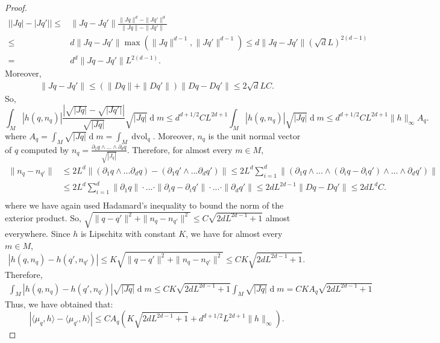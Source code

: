 \documentclass[10pt,a4paper]{amsart}
\begin{document}
\begin{proof}
\begin{align*}
    \left||Jq|-|Jq'|\right|\leq& \|Jq-Jq'\| \frac{\|Jq\|^d-\|Jq'\|^d}{\|Jq\|-\|Jq'\|} \\
    \leq& d \|Jq-Jq'\| \max\left(\|Jq\|^{d-1},\|Jq'\|^{d-1}\right)\leq d \|Jq-Jq'\| (\sqrt{d}L)^{2(d-1)}\\
    =&d^d \|Jq-Jq'\| L^{2(d-1)}.
\end{align*} 
Moreover,
\begin{align*}
    \|Jq-Jq'\|\leq (\|Dq\|+\|Dq'\|)\|Dq-Dq'\|\leq 2\sqrt{d}LC.
\end{align*}
So,
\begin{equation*}
    \int_{M} |h(q,n_q)|\frac{\left|\sqrt{|Jq|}-\sqrt{|Jq'|}\right|}{\sqrt{|Jq|}} \sqrt{|Jq|}\operatorname{d}m\leq d^{d+1/2}CL^{2d+1}\int_M |h(q,n_q)|\sqrt{|Jq|}\operatorname{d}m \leq d^{d+1/2}CL^{2d+1}\|h\|_{\infty}A_q.
\end{equation*} 
where $A_q=\int_M \sqrt{|Jq|}\operatorname{d}m = \int_M \operatorname{d vol}_q$. Moreover, $n_q$ is the unit normal vector of $q$ computed by $n_q = \frac{\partial_1q\wedge\ldots\wedge\partial_dq}{\sqrt{|J_q|}}$. Therefore, for almost every $m\in M$, 
\begin{align*}
    \|n_q-n_{q'}\|&\leq 2L^d\|(\partial_1q\wedge...\partial_dq)-(\partial_1q'\wedge...\partial_dq')\|\leq2L^d\sum_{i=1}^d\|(\partial_1q\wedge...\wedge(\partial_iq-\partial_iq')\wedge...\wedge\partial_dq')\|\\
    &\leq2L^d\sum_{i=1}^d \|\partial_1q\|\cdot...\cdot\|\partial_iq-\partial_iq'\|\cdot...\cdot\|\partial_dq'\|\leq 2dL^{2d-1} \|Dq-Dq'\|\leq 2dL^dC.\\
\end{align*}
where we have again used Hadamard's inequality to bound the norm of the exterior product. So, $\sqrt{\|q-q'\|^2+\|n_q-n_{q'}\|^2}\leq  C\sqrt{2dL^{2d-1} + 1}$ almost everywhere.
Since $h$ is Lipschitz with constant $K$, we have for almost every $m \in M$,
\begin{equation*}
    |h(q, n_q) - h(q', n_{q'})| \leq K \sqrt{\|q-q'\|^2+\|n_q-n_{q'}\|^2} \leq CK\sqrt{2dL^{2d-1} + 1} .
\end{equation*} 
Therefore,
\begin{align*}
    \int_{M} \left|h(q,n_q)-h(q',n_{q'})\right| \sqrt{|Jq|} \operatorname{d}m \leq CK\sqrt{2dL^{2d-1} + 1}\int_M\sqrt{|Jq|}\operatorname{d}m = CKA_q\sqrt{2dL^{2d-1} + 1}
\end{align*}
Thus, we have obtained that:
\begin{equation*}
    |\langle\mu_q,h\rangle-\langle\mu_{q'},h\rangle|\leq CA_q(K\sqrt{2dL^{2d-1} + 1}+d^{d+1/2}L^{2d+1}\|h\|_{\infty}).
\end{equation*}
\end{proof}
\end{document}

